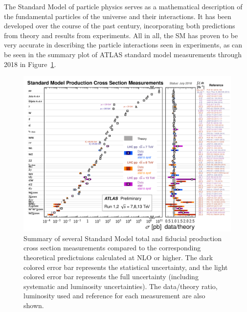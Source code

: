 ﻿The Standard Model of particle physics serves as a mathematical description of the fundamental particles of the universe and their interactions.
It has been developed over the course of the past century, incorporating both predictions from theory and results from experiments.
All in all, the SM has proven to be very accurate in describing the particle interactions seen in experiments, as can be seen in the summary plot of ATLAS standard model measurements through 2018 in Figure~\ref{fig:theory_sm_meas}.

\begin{figure}
  \centering
  \includegraphics[width=.95\textwidth]{figs/theory/ATLAS_sm_measurements}
  \caption[Summary of several Standard Model total and fiducial production cross section measurements compared to the corresponding theoretical predictuions calculated at NLO or higher. The dark colored error bar represents the statistical uncertainty, and the light colored error bar represents the full uncertainty (including systematic and luminosity uncertainties). The data/theory ratio, luminosity used and reference for each measurement are also shown.]{Summary of several Standard Model total and fiducial production cross section measurements compared to the corresponding theoretical predictuions calculated at NLO or higher. The dark colored error bar represents the statistical uncertainty, and the light colored error bar represents the full uncertainty (including systematic and luminosity uncertainties). The data/theory ratio, luminosity used and reference for each measurement are also shown.~\cite{2019.atlas-summary-plots}}
  \label{fig:theory_sm_meas}
\end{figure}

